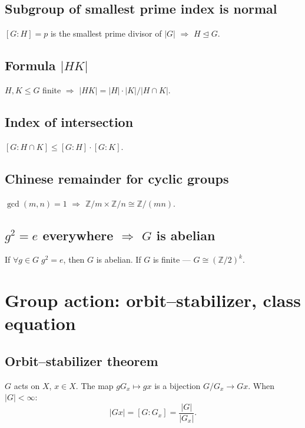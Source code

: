 \subsection{Subgroup of smallest prime index is normal}
\label{subsec:smallest-prime-index}

$[G:H]=p$ is the smallest prime divisor of $|G|$ $\Rightarrow$ $H\trianglelefteq G$.

\subsection{Formula $|HK|$}
\label{subsec:hk-formula}

$H,K\le G$ finite $\Rightarrow$ $|HK|=|H|\cdot|K|/|H\cap K|$.

\subsection{Index of intersection}
\label{subsec:index-intersection}

$[G:H\cap K]\le[G:H]\cdot[G:K]$.

\subsection{Chinese remainder for cyclic groups}
\label{subsec:crt-cyclic}

$\gcd(m,n)=1$ $\Rightarrow$ $\mathbb{Z}/m\times\mathbb{Z}/n\cong\mathbb{Z}/(mn)$.

\subsection{$g^2=e$ everywhere $\Rightarrow$ $G$ is abelian}
\label{subsec:g2-e}

If $\forall g\in G\;g^2=e$, then $G$ is abelian. If $G$ is finite --- $G\cong(\mathbb{Z}/2)^k$.

\medskip

\section{Group action: orbit--stabilizer, class equation}
\label{sec:group-action}

\subsection{Orbit--stabilizer theorem}
\label{subsec:orbit-stabilizer}

$G$ acts on $X$, $x\in X$. The map $gG_x\mapsto gx$ is a bijection $G/G_x\to Gx$. When $|G|<\infty$:
$$|Gx|=[G:G_x]=\frac{|G|}{|G_x|}.$$

